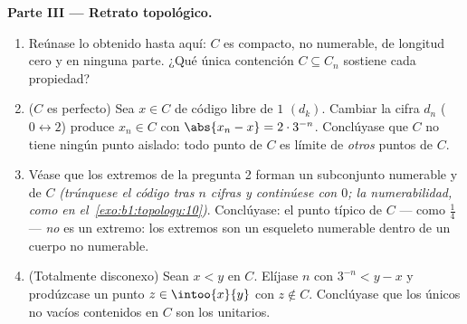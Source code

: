 \begin{problem}[{Problema del fin de semana --- el \omterm{pb:b1:topology:1}{conjunto de Cantor}
de los tercios centrales: longitud cero, no numerable, perfecto y
$C + C = \intcc{0}{2}$}]
\medskip
\noindent\textbf{Parte III --- Retrato topológico.}
\begin{enumerate}[resume]
  \item Reúnase lo obtenido hasta aquí: $C$ es compacto, no
        numerable, de longitud cero y  en ninguna parte. ¿Qué
        única contención $C \subseteq C_n$ sostiene cada propiedad?
  \item ($C$ es perfecto) Sea $x \in C$ de código libre de $1$
        $(d_k)$. Cambiar la cifra $d_n$ ($0 \leftrightarrow 2$)
        produce $x_n \in C$ con $\abs{x_n - x} = 2 \cdot 3^{-n}$.
        Conclúyase que $C$ no tiene ningún punto aislado: todo punto
        de $C$ es límite de \emph{otros} puntos de $C$.
  \item Véase que los extremos de la pregunta 2 forman un subconjunto
        numerable y  de $C$ \emph{(trúnquese el código tras $n$
        cifras y continúese con $0$; la numerabilidad, como en
        el~\cref{exo:b1:topology:10})}. Conclúyase: el punto típico de
        $C$ --- como $\frac14$ --- \emph{no} es un extremo: los
        extremos son un esqueleto numerable dentro de un cuerpo no
        numerable.
  \item (Totalmente disconexo) Sean $x < y$ en $C$. Elíjase $n$ con
        $3^{-n} < y - x$ y prodúzcase un punto $z \in \intoo{x}{y}$
        con $z \notin C$. Conclúyase que los únicos  no
        vacíos contenidos en $C$ son los  unitarios.
\end{enumerate}


\end{problem}
